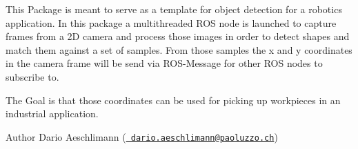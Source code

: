 This Package is meant to serve as a template for object detection for a robotics application. In this package a multithreaded R\+OS node is launched to capture frames from a 2D camera and process those images in order to detect shapes and match them against a set of samples. From those samples the x and y coordinates in the camera frame will be send via R\+O\+S-\/\+Message for other R\+OS nodes to subscribe to.

The Goal is that those coordinates can be used for picking up workpieces in an industrial application.

\begin{DoxyAuthor}{Author}
Dario Aeschlimann (\href{mailto:dario.aeschlimann@paoluzzo.ch}{\texttt{ dario.\+aeschlimann@paoluzzo.\+ch}}) 
\end{DoxyAuthor}
